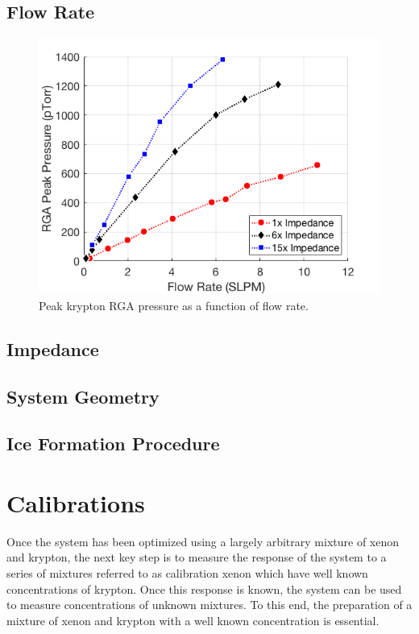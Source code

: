 \documentclass[12pt]{article}
\begin{document}
\subsection{Flow Rate}


\begin{figure}[h]
  \includegraphics[width=\linewidth]{Figures/FlowResponse.png}
  \caption{Peak krypton RGA pressure as a function of flow rate.  }
  \label{fig:flowresponse1x}
\end{figure}

\subsection{Impedance}

\subsection{System Geometry}
\label{sec:geometry}

\subsection{Ice Formation Procedure}

\section{Calibrations}
Once the system has been optimized using a largely arbitrary mixture of xenon and krypton, the next key step is to measure the response of the system to a series of mixtures referred to as calibration xenon which have well known concentrations of krypton. Once this response is known, the system can be used to measure concentrations of unknown mixtures. To this end, the preparation of a mixture of xenon and krypton with a well known concentration is essential.
\end{document}

